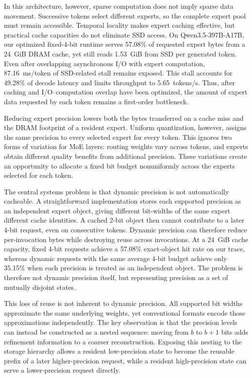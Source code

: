 \documentclass[sigconf, nonacm]{acmart}
\begin{document}
In this architecture, however, sparse computation does not imply
sparse data movement. Successive tokens select different experts, so
the complete expert pool must remain accessible. Temporal locality
makes expert caching effective, but practical cache capacities do not
eliminate SSD access. On Qwen3.5-397B-A17B, our optimized fixed-4-bit
runtime serves 57.08\% of requested expert bytes from a 24~GiB DRAM
cache, yet still reads 1.53~GiB from SSD per generated token. Even
after overlapping asynchronous I/O with expert computation,
87.16~ms/token of SSD-related stall remains exposed. This stall
accounts for 49.28\% of decode latency and limits throughput to
5.65~tokens/s. Thus, after caching and I/O--computation overlap have
been optimized, the amount of expert data requested by each token
remains a first-order bottleneck.

Reducing expert precision lowers both the bytes transferred on a cache
miss and the DRAM footprint of a resident expert. Uniform quantization,
however, assigns the same precision to every selected expert for every token.
This ignores two forms of variation for MoE layers: routing weights vary across
tokens, and experts obtain different quality benefits from additional
precision. These variations create an opportunity to allocate a fixed bit budget nonuniformly across the experts selected for each token.

The central systems problem is that dynamic precision is not
automatically cacheable. A straightforward implementation stores each
supported precision as an independent expert object, giving different
bit-widths of the same expert different cache identities. A cached
2-bit object then cannot contribute to a later 4-bit request, even on
consecutive tokens. Dynamic precision can therefore reduce
per-invocation bytes while destroying reuse across invocations. At a
24~GiB cache capacity, fixed 4-bit requests achieve a 57.08\%
exact-object hit rate on our trace, whereas dynamic requests with the
same average 4-bit budget achieve only 35.15\% when each precision is
treated as an independent object. The problem is therefore not
dynamic precision itself, but representing precision as a set of
mutually disjoint states.

This loss of reuse is not inherent to dynamic precision. All supported
bit widths approximate the same underlying weights, yet conventional
formats encode those approximations independently. The key observation
is that the precision levels can instead be constructed as a nested
sequence: moving from $b$ to $b+1$ bits adds refinement information to
a coarser reconstruction. Exposing this nesting to the storage
hierarchy allows a resident low-precision state to become the reusable
prefix of a later higher-precision request, while a resident
high-precision state can serve a lower-precision request directly.
\end{document}
